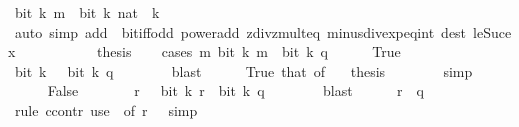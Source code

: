 \begin{isabellebody}
\ {\isacartoucheopen}bit\ k\ m\ {\isasymlongleftrightarrow}\ bit\ k\ {\isacharparenleft}{\kern0pt}nat\ {\isacharparenleft}{\kern0pt}{\isacharminus}{\kern0pt}\ k{\isacharparenright}{\kern0pt}{\isacharparenright}{\kern0pt}{\isacartoucheclose}\isanewline
\ \ \ \ \ \ \ \ \isamarkupfalse%
\ {\isacharparenleft}{\kern0pt}auto\ simp\ add{\isacharcolon}{\kern0pt}\ {\isacharasterisk}{\kern0pt}\ bit{\isacharunderscore}{\kern0pt}iff{\isacharunderscore}{\kern0pt}odd\ power{\isacharunderscore}{\kern0pt}add\ zdiv{\isacharunderscore}{\kern0pt}zmult{}{\isacharunderscore}{\kern0pt}eq\ minus{\isacharunderscore}{\kern0pt}{}{\isacharunderscore}{\kern0pt}div{\isacharunderscore}{\kern0pt}exp{\isacharunderscore}{\kern0pt}eq{\isacharunderscore}{\kern0pt}int\ dest{\isacharbang}{\kern0pt}{\isacharcolon}{\kern0pt}\ le{\isacharunderscore}{\kern0pt}Suc{\isacharunderscore}{\kern0pt}ex{\isacharparenright}{\kern0pt}\isanewline
\ \ \ \ \isamarkupfalse%
\isanewline
\ \ \isamarkupfalse%
\isanewline
\ \ \isamarkupfalse%
\ thesis\isanewline
\ \ \isamarkupfalse%
\ {\isacharparenleft}{\kern0pt}cases\ {\isacartoucheopen}{\isasymforall}m{\isachardot}{\kern0pt}\ bit\ k\ m\ {\isasymlongleftrightarrow}\ bit\ k\ q{\isacartoucheclose}{\isacharparenright}{\kern0pt}\isanewline
\ \ \ \ \isamarkupfalse%
\ True\isanewline
\ \ \ \ \isamarkupfalse%
\ \isamarkupfalse%
\ {\isacartoucheopen}bit\ k\ {}\ {\isasymlongleftrightarrow}\ bit\ k\ q{\isacartoucheclose}\isanewline
\ \ \ \ \ \ \isamarkupfalse%
\ blast\isanewline
\ \ \ \ \isamarkupfalse%
\ True\ that\ {\isacharbrackleft}{\kern0pt}of\ {}{\isacharbrackright}{\kern0pt}\ \isamarkupfalse%
\ thesis\isanewline
\ \ \ \ \ \ \isamarkupfalse%
\ simp\isanewline
\ \ \isamarkupfalse%
\isanewline
\ \ \ \ \isamarkupfalse%
\ False\isanewline
\ \ \ \ \isamarkupfalse%
\ \isamarkupfalse%
\ r\ \ {\isacharasterisk}{\kern0pt}{\isacharasterisk}{\kern0pt}{\isacharcolon}{\kern0pt}\ {\isacartoucheopen}bit\ k\ r\ {\isasymnoteq}\ bit\ k\ q{\isacartoucheclose}\isanewline
\ \ \ \ \ \ \isamarkupfalse%
\ blast\isanewline
\ \ \ \ \isamarkupfalse%
\ {\isacartoucheopen}r\ {\isacharless}{\kern0pt}\ q{\isacartoucheclose}\isanewline
\ \ \ \ \ \ \isamarkupfalse%
\ {\isacharparenleft}{\kern0pt}rule\ ccontr{\isacharparenright}{\kern0pt}\ {\isacharparenleft}{\kern0pt}use\ {\isacharasterisk}{\kern0pt}\ {\isacharbrackleft}{\kern0pt}of\ r{\isacharbrackright}{\kern0pt}\ {\isacharasterisk}{\kern0pt}{\isacharasterisk}{\kern0pt}\ \ simp{\isacharparenright}{\kern0pt}\isanewline

\end{isabellebody}
